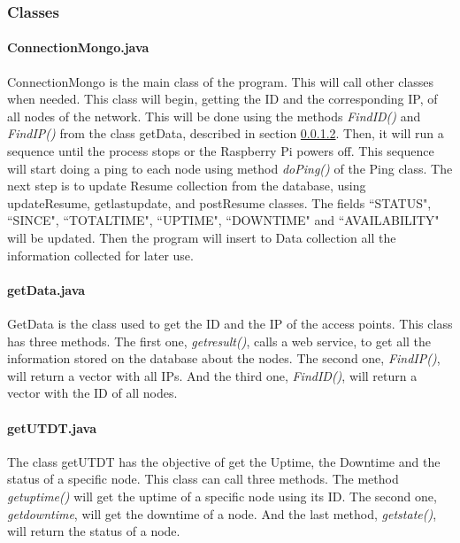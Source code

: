 \documentclass[12pt, a4paper,twoside]{tesi_upf}
\begin{document}
           
        
            \subsubsection{Classes}
            \label{classes}
                \paragraph{ConnectionMongo.java}
                
                ConnectionMongo is the main class of the program. This will call other classes when needed. This class will begin, getting the ID and the corresponding IP, of all nodes of the network. This will be done using the methods \textit{FindID()} and \textit{FindIP()} from the class getData, described in section \ref{getData.java}. Then, it will run a sequence until the process stops or the Raspberry Pi powers off. This sequence will start doing a ping to each node using method \textit{doPing()} of the Ping class. The next step is to update Resume collection from the database, using updateResume, getlastupdate, and postResume classes. The fields ``STATUS", ``SINCE", ``TOTALTIME", ``UPTIME", ``DOWNTIME" and ``AVAILABILITY" will be updated. Then the program will insert to Data collection all the information collected for later use.\\
            
                \paragraph{getData.java}
                \label{getData.java}
                 
                GetData is the class used to get the ID and the IP of the access points. This class has three methods. The first one, \textit{getresult()}, calls a web service, to get all the information stored on the database about the nodes. The second one, \textit{FindIP()}, will return a vector with all IPs. And the third one, \textit{FindID()}, will return a vector with the ID of all nodes.\\

                \paragraph{getUTDT.java}
                
                The class getUTDT has the objective of get the Uptime, the Downtime and the status of a specific node. This class can call three methods. The method \textit{getuptime()} will get the uptime of a specific node using its ID. The second one, \textit{getdowntime}, will get the downtime of a node. And the last method, \textit{getstate()}, will return the status of a node.\\
                
\end{document}
